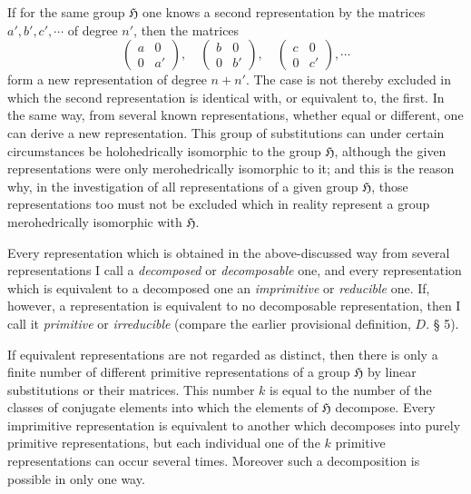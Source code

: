 \documentclass[11pt]{article}
\newcommand{\Hgr}{\mathfrak{H}}
\begin{document}
If for the same group $\Hgr$ one knows a second representation by the matrices $a',b',c',\cdots$ of degree $n'$, then the matrices
\[
\begin{pmatrix}a&0\\0&a'\end{pmatrix},\quad
\begin{pmatrix}b&0\\0&b'\end{pmatrix},\quad
\begin{pmatrix}c&0\\0&c'\end{pmatrix},\cdots
\]
form a new representation of degree $n+n'$. The case is not thereby excluded in which the second representation is identical with, or equivalent to, the first. In the same way, from several known representations, whether equal or different, one can derive a new representation. This group of substitutions can under certain circumstances be holohedrically isomorphic to the group $\Hgr$, although the given representations were only merohedrically isomorphic to it; and this is the reason why, in the investigation of all representations of a given group $\Hgr$, those representations too must not be excluded which in reality represent a group merohedrically isomorphic with $\Hgr$.

Every representation which is obtained in the above-discussed way from several representations I call a \emph{decomposed} or \emph{decomposable} one, and every representation which is equivalent to a decomposed one an \emph{imprimitive} or \emph{reducible} one. If, however, a representation is equivalent to no decomposable representation, then I call it \emph{primitive} or \emph{irreducible} (compare the earlier provisional definition, $D.$ § 5).

If equivalent representations are not regarded as distinct, then there is only a finite number of different primitive representations of a group $\Hgr$ by linear substitutions or their matrices. This number $k$ is equal to the number of the classes of conjugate elements into which the elements of $\Hgr$ decompose. Every imprimitive representation is equivalent to another which decomposes into purely primitive representations, but each individual one of the $k$ primitive representations can occur several times. Moreover such a decomposition is possible in only one way.
\end{document}

